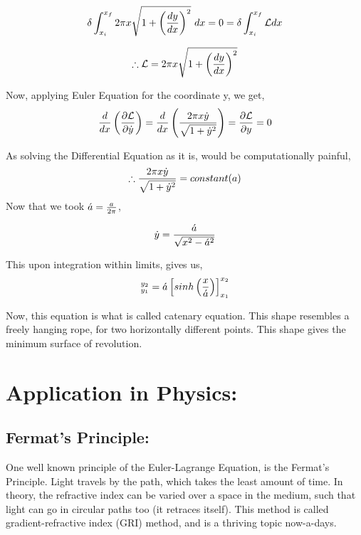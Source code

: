 \documentclass[a4paper]{article}
\begin{document}
\begin{equation}
    \delta\int_{x_i}^{x_f}2\pi x \sqrt{1 + \left(dy\over dx\right)^{2}}\ dx = 0 = \delta\int_{x_i}^{x_f}{\mathcal{L}dx}\label{eq:surf_s_1}
\end{equation}

\begin{equation}
    \therefore \mathcal{L} = 2\pi x \sqrt{1 + \left(dy\over dx\right)^{2}}
\end{equation}

Now, applying Euler Equation for the coordinate y, we get, 
\begin{equation}
    {d\over dx}\left(\partial \mathcal{L}\over \partial \dot y\right) = {d\over dx}\left(2\pi x \dot y \over \sqrt{1 + {\dot y}^2}\right) = {\partial \mathcal{L}\over \partial y} = 0
\end{equation}

As solving the Differential Equation as it is, would be computationally painful,
\begin{equation}
    \therefore {2\pi x \dot y \over \sqrt{1 + {\dot y}^2}} = constant (a)
\end{equation}
Now that we took $\acute a = {a \over 2\pi}$,

\begin{equation}
    \dot y = {\acute a \over \sqrt {x^2-{\acute a}^2}}
\end{equation}

This upon integration within limits, gives us,
\begin{equation}
    [y]_{y_1}^{y_2} = \acute a \left[sinh\left(x\over \acute a\right)\right]_{x_1}^{x_2}
\end{equation}

Now, this equation is what is called catenary equation. This shape resembles a freely hanging rope, for two horizontally different points. This shape gives the minimum surface of revolution.

\section{Application in Physics:}
\subsection{Fermat's Principle:}
One well known principle of the Euler-Lagrange Equation, is the Fermat's Principle. Light travels by the path, which takes the least amount of time. In theory, the refractive index can be varied over a space in the medium, such that light can go in circular paths too (it retraces itself). This method is called gradient-refractive index (GRI) method, and is a thriving topic now-a-days.
\end{document}
